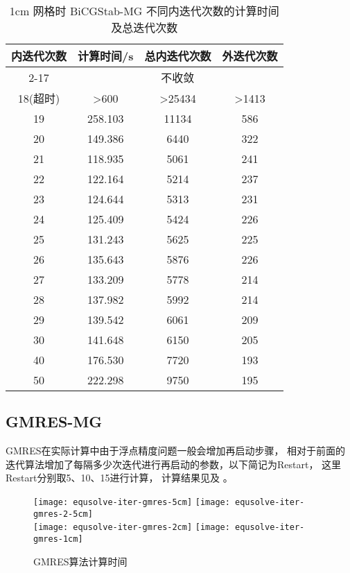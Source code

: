 \begin{datasheet}
\begin{table}
\centering
\caption{1cm 网格时 BiCGStab-MG 不同内迭代次数的计算时间及总迭代次数}
\label{tab:equsolve.iter.bicgstab-mg.1cm}
\begin{tabular}{cccc}
\toprule
内迭代次数 & 计算时间/s & 总内迭代次数 & 外迭代次数\\
\midrule
2-17 & \multicolumn{3}{c}{不收敛} \\ %
18(超时) & >600 & >25434 & >1413 \\ %
19 & 258.103 & 11134 & 586\\
20 & 149.386 & 6440 & 322\\
21 & 118.935 & 5061 & 241\\
22 & 122.164 & 5214 & 237\\
23 & 124.644 & 5313 & 231\\
24 & 125.409 & 5424 & 226\\
25 & 131.243 & 5625 & 225\\
26 & 135.643 & 5876 & 226\\
27 & 133.209 & 5778 & 214\\
28 & 137.982 & 5992 & 214\\
29 & 139.542 & 6061 & 209\\
30 & 141.648 & 6150 & 205\\
40 & 176.530 & 7720 & 193\\
50 & 222.298 & 9750 & 195\\
\bottomrule
\end{tabular}
\end{table}

\end{datasheet}

\subsection{GMRES-MG}
GMRES在实际计算中由于浮点精度问题一般会增加再启动步骤，
相对于前面的迭代算法增加了每隔多少次迭代进行再启动的参数，以下简记为Restart，
这里Restart分别取5、10、15进行计算，
计算结果见及
。

\begin{figure}
\centering
{}
{\texttt{[image: equsolve-iter-gmres-5cm]}}
{\texttt{[image: equsolve-iter-gmres-2-5cm]}}
\\[1cm]
{\texttt{[image: equsolve-iter-gmres-2cm]}}
{\texttt{[image: equsolve-iter-gmres-1cm]}}
\caption{\label{fig:fig:equsolve.iter.gmres}GMRES算法计算时间}
\end{figure}

